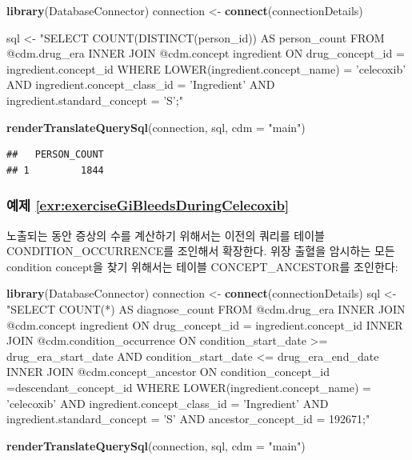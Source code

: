 \documentclass[10.5pt]{book}
\newenvironment{Shaded}{\begin{snugshade}}{\end{snugshade}}
\newcommand{\KeywordTok}[1]{\textcolor[rgb]{0.13,0.29,0.53}{\textbf{#1}}}
\newcommand{\DataTypeTok}[1]{\textcolor[rgb]{0.13,0.29,0.53}{#1}}
\newcommand{\StringTok}[1]{\textcolor[rgb]{0.31,0.60,0.02}{#1}}
\newcommand{\NormalTok}[1]{#1}
\theoremstyle{definition}
\theoremstyle{definition}
\theoremstyle{definition}
\theoremstyle{remark}
\begin{document}
\begin{Shaded}
\begin{Highlighting}[]
\KeywordTok{library}\NormalTok{(DatabaseConnector)}
\NormalTok{connection <-}\StringTok{ }\KeywordTok{connect}\NormalTok{(connectionDetails)}

\NormalTok{sql <-}\StringTok{ "SELECT COUNT(DISTINCT(person_id)) AS person_count}
\StringTok{FROM @cdm.drug_era}
\StringTok{INNER JOIN @cdm.concept ingredient}
\StringTok{  ON drug_concept_id = ingredient.concept_id}
\StringTok{WHERE LOWER(ingredient.concept_name) = 'celecoxib'}
\StringTok{  AND ingredient.concept_class_id = 'Ingredient'}
\StringTok{  AND ingredient.standard_concept = 'S';"}

\KeywordTok{renderTranslateQuerySql}\NormalTok{(connection, sql, }\DataTypeTok{cdm =} \StringTok{"main"}\NormalTok{)}
\end{Highlighting}
\end{Shaded}

\begin{verbatim}
##   PERSON_COUNT
## 1         1844
\end{verbatim}

\subsubsection*{예제
\ref{exr:exerciseGiBleedsDuringCelecoxib}}\label{-refexrexercisegibleedsduringcelecoxib}

노출되는 동안 증상의 수를 계산하기 위해서는 이전의 쿼리를 테이블
CONDITION\_OCCURRENCE를 조인해서 확장한다. 위장 출혈을 암시하는 모든
condition concept을 찾기 위해서는 테이블 CONCEPT\_ANCESTOR를 조인한다:

\begin{Shaded}
\begin{Highlighting}[]
\KeywordTok{library}\NormalTok{(DatabaseConnector)}
\NormalTok{connection <-}\StringTok{ }\KeywordTok{connect}\NormalTok{(connectionDetails)}
\NormalTok{sql <-}\StringTok{ "SELECT COUNT(*) AS diagnose_count}
\StringTok{FROM @cdm.drug_era}
\StringTok{INNER JOIN @cdm.concept ingredient}
\StringTok{  ON drug_concept_id = ingredient.concept_id}
\StringTok{INNER JOIN @cdm.condition_occurrence}
\StringTok{  ON condition_start_date >= drug_era_start_date}
\StringTok{    AND condition_start_date <= drug_era_end_date}
\StringTok{INNER JOIN @cdm.concept_ancestor}
\StringTok{  ON condition_concept_id =descendant_concept_id}
\StringTok{WHERE LOWER(ingredient.concept_name) = 'celecoxib'}
\StringTok{  AND ingredient.concept_class_id = 'Ingredient'}
\StringTok{  AND ingredient.standard_concept = 'S'}
\StringTok{  AND ancestor_concept_id = 192671;"}

\KeywordTok{renderTranslateQuerySql}\NormalTok{(connection, sql, }\DataTypeTok{cdm =} \StringTok{"main"}\NormalTok{)}
\end{Highlighting}
\end{Shaded}
\end{document}

